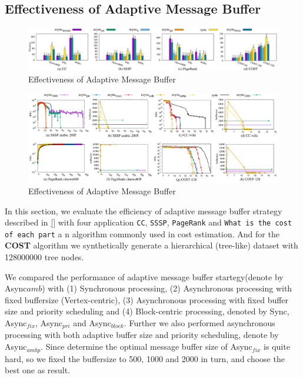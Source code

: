 \subsection{Effectiveness of Adaptive Message Buffer}
\label{sec:expr:AMBuffer}
\begin{figure}[!t]
	\vspace{0.0in}
	\centering
	\includegraphics[width=7.0in]{figuration/summary.eps}
	\vspace{-0.1in}
	\caption{Effectiveness of Adaptive Message Buffer}
	\label{fig:summary}
	\vspace{-0.1in}
\end{figure}
\begin{figure}[!t]
	\centering
	\includegraphics[width=7.0in]{figuration/combine.eps}
	\vspace{-0.1in}
	\caption{Effectiveness of Adaptive Message Buffer}
	\label{fig:details}
	\vspace{-0.1in}
\end{figure}



In this section, we evaluate the efficiency of adaptive message buffer strategy described in \ref{} with four application \texttt{CC}, \texttt{SSSP}, \texttt{PageRank} and \texttt{What is the cost of each part}\cite{7113340} a n algorithm commonly used in cost estimation. And for the \textbf{COST} algorithm we synthetically generate a hierarchical (tree-like) dataset with 128000000 tree nodes.

We compared the performance of adaptive message buffer startegy(denote by Async${amb}$) with (1) Synchronous processing, (2) Asynchronous processing with fixed buffersize (Vertex-centric), (3) Asynchronous processing with fixed buffer size and priority scheduling and (4) Block-centric processing, denoted by Sync, Async$_{fix}$, Async$_{pri}$ and Async$_{block}$. Further we also performed asynchronous processing with both adaptive buffer size and priority scheduling, denote by Async$_{ambp}$. Since determine the optimal message buffer size of Async$_{fix}$ is quite hard, so we fixed the buffersize to 500, 1000 and 2000 in turn, and choose the best one as result.


